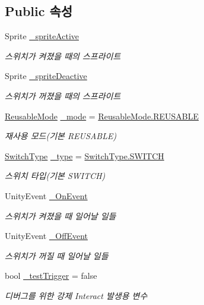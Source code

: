 \subsection*{Public 속성}
\begin{DoxyCompactItemize}
\item 
Sprite \mbox{\hyperlink{class_switch_afa73947391c220a1a6649ebfde9b3f29}{\+\_\+sprite\+Active}}
\begin{DoxyCompactList}\small\item\em 스위치가 켜졌을 때의 스프라이트 \end{DoxyCompactList}\item 
Sprite \mbox{\hyperlink{class_switch_a07fa9da72f21c271622813fe9fafa40f}{\+\_\+sprite\+Deactive}}
\begin{DoxyCompactList}\small\item\em 스위치가 꺼졌을 때의 스프라이트 \end{DoxyCompactList}\item 
\mbox{\hyperlink{class_switch_ab6cd06c871c19ba8fbe1765515a828cc}{Reusable\+Mode}} \mbox{\hyperlink{class_switch_a763af35d8442209649d2a1db2f3aa0cc}{\+\_\+mode}} = \mbox{\hyperlink{class_switch_ab6cd06c871c19ba8fbe1765515a828ccaa9dc406f543aa119dd64d44539c1d621}{Reusable\+Mode.\+R\+E\+U\+S\+A\+B\+LE}}
\begin{DoxyCompactList}\small\item\em 재사용 모드(기본 R\+E\+U\+S\+A\+B\+LE) \end{DoxyCompactList}\item 
\mbox{\hyperlink{class_switch_aa3d83cf921138e9b74aa9a28f1970a3f}{Switch\+Type}} \mbox{\hyperlink{class_switch_a8e2af94ed2134ec3d42860bcbf60de66}{\+\_\+type}} = \mbox{\hyperlink{class_switch_aa3d83cf921138e9b74aa9a28f1970a3fa4239f063a3d4fb9d38a0182be6e39e76}{Switch\+Type.\+S\+W\+I\+T\+CH}}
\begin{DoxyCompactList}\small\item\em 스위치 타입(기본 S\+W\+I\+T\+CH) \end{DoxyCompactList}\item 
Unity\+Event \mbox{\hyperlink{class_switch_a8485f562cae8388cc00614d3d0327405}{\+\_\+\+On\+Event}}
\begin{DoxyCompactList}\small\item\em 스위치가 켜졌을 때 일어날 일들 \end{DoxyCompactList}\item 
Unity\+Event \mbox{\hyperlink{class_switch_a7618e6c742dd3b2e6bb3fe4f56255896}{\+\_\+\+Off\+Event}}
\begin{DoxyCompactList}\small\item\em 스위치가 꺼질 때 일어날 일들 \end{DoxyCompactList}\item 
bool \mbox{\hyperlink{class_switch_ad88a45b17c0618e096db2eede7eebd72}{\+\_\+test\+Trigger}} = false
\begin{DoxyCompactList}\small\item\em 디버그를 위한 강제 Interact 발생용 변수 \end{DoxyCompactList}\end{DoxyCompactItemize}
